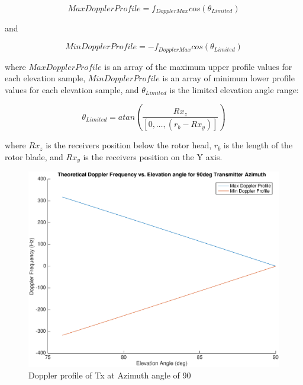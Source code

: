 \begin{equation}
	MaxDopplerProfile = f_{DopplerMax}cos(\theta_{Limited})
	\label{eq:theory_90_upper}
\end{equation}

and

\begin{equation}
	MinDopplerProfile = -f_{DopplerMax}cos(\theta_{Limited})
	\label{eq:theory_90_lower}
\end{equation}

where $MaxDopplerProfile$ is an array of the maximum upper profile values for each elevation sample, $MinDopplerProfile$ is an array of minimum lower profile values for each elevation sample, and $\theta_{Limited}$ is the limited elevation angle range:

\begin{equation}
	\theta_{Limited} = atan\left(\frac{Rx_z}{[0,\dots, (r_b - Rx_y)]}\right)
	\label{eq:theory_90_limited}
\end{equation}

where $Rx_z$ is the receivers position below the rotor head, $r_b$ is the length of the rotor blade, and $Rx_y$ is the receivers position on the Y axis.

\begin{figure}
	\begin{center}
		\includegraphics[width=15cm]{images/background/3d_geometry_tx_90az_doppler_profile.eps}
		\caption{Doppler profile of Tx at Azimuth angle of 90\textdegree}
		\label{fig:3D_model_90az_doppler}
	\end{center}
\end{figure}

